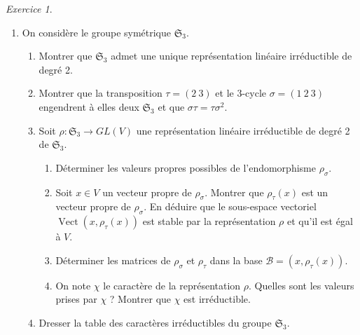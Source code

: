 \documentclass[french]{book}
\theoremstyle{definition}
\theoremstyle{remark}
\newtheorem{exo}{Exercice}
\begin{document}
\begin{exo}
\begin{enumerate}
    \item On considère le groupe symétrique \(\mathfrak{S}_{3}\).
    \begin{enumerate}
      \item Montrer que \(\mathfrak{S}_{3}\) admet une unique représentation linéaire irréductible de degré 2.
      \item Montrer que la transposition \(\tau = (2 \ 3)\) et le 3-cycle \(\sigma = (1 \ 2 \ 3)\) engendrent à elles deux \(\mathfrak{S}_{3}\) et que \(\sigma \tau = \tau \sigma^2\).
      \item Soit \(\rho : \mathfrak{S}_{3} \longrightarrow GL(V)\) une représentation linéaire irréductible de degré 2 de \(\mathfrak{S}_{3}\).
      \begin{enumerate}
        \item Déterminer les valeurs propres possibles de l'endomorphisme \(\rho _{\sigma}\).
        \item Soit \(x \in V\) un vecteur propre de \(\rho _{\sigma}\). Montrer que \(\rho _{\tau}(x)\) est un vecteur propre de \(\rho _{\sigma}\). En déduire que le sous-espace vectoriel \(\operatorname{Vect}(x, \rho _{\tau}(x))\) est stable par la représentation \(\rho\) et qu'il est égal à \(V\).
        \item Déterminer les matrices de \(\rho _{\sigma}\) et \(\rho _{\tau}\) dans la base \(\mathcal{B} = (x, \rho _{\tau}(x))\).
        \item On note \(\chi\) le caractère de la représentation \(\rho\). Quelles sont les valeurs prises par \(\chi\) ? Montrer que \(\chi\) est irréductible.
      \end{enumerate}
      \item Dresser la table des caractères irréductibles du groupe \(\mathfrak{S}_{3}\).
    \end{enumerate}
  \end{enumerate}
\end{exo}
\end{document}
